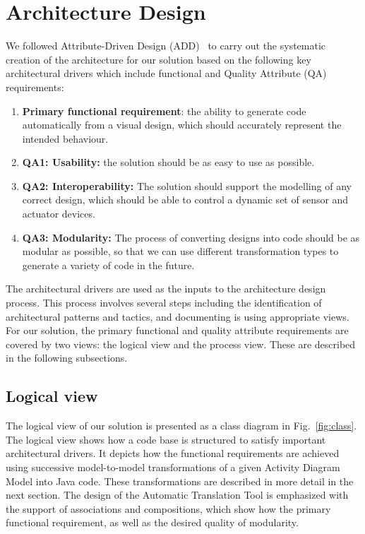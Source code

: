 \section{Architecture Design}
\label{Architecture Design}

We followed Attribute-Driven Design (ADD)~\cite{clements2002documenting} to carry out the systematic creation of the architecture for our solution  based on the following key architectural drivers which include functional and Quality Attribute (QA) requirements:

\begin{enumerate}
    \item \textbf{Primary functional requirement}: the ability to generate code automatically from a visual design, which should accurately represent the intended behaviour.
    \item \textbf{QA1: Usability:} the solution should be as easy to use as possible.
    \item \textbf{QA2: Interoperability:} The solution should support the modelling of any correct design, which should be able to control a dynamic set of sensor and actuator devices.
   \item \textbf{QA3: Modularity:} The process of converting designs into code should be as modular as possible, so that we can use different transformation types to generate a variety of code in the future.
\end{enumerate}

The architectural drivers are used as the inputs to the architecture design process. This process involves several steps including the identification of architectural patterns and tactics, and documenting is using appropriate views. For our solution, the primary functional and quality attribute requirements are covered by two views: the logical view and the process view. These are described in the following subsections. 


\subsection{Logical view}

The logical view of our solution is presented as a class diagram in Fig.~\ref{fig:class}.
The logical view shows how a code base is structured to satisfy important architectural drivers.
It depicts how the functional requirements are achieved using successive model-to-model transformations of a given Activity Diagram Model into Java code.
These transformations are described in more detail in the next section.
The design of the Automatic Translation Tool is emphasized with the support of associations and compositions, which show how the primary functional requirement, as well as the desired quality of modularity.

